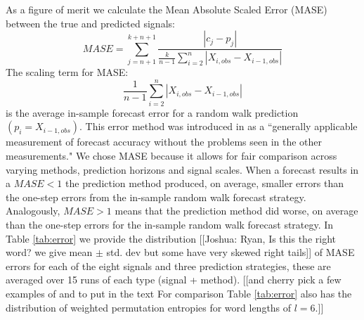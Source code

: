 As a figure of merit we calculate the Mean Absolute Scaled Error (MASE)\cite{MASE} between the true and predicted signals: 
$$MASE = \sum_{j=n+1}^{k+n+1}\frac{|c_j-p_j| }{\frac{k}{n-1}\sum^n_{i=2}|X_{i,obs}-X_{i-1,obs}|}$$
The scaling term for MASE:
$$\frac{1}{n-1}\sum^n_{i=2}|X_{i,obs}-X_{i-1,obs}|$$ 
is the average in-sample forecast error for a random walk prediction $(p_i=X_{i-1,obs})$. This error method was introduced in \cite{MASE} as a ``generally applicable measurement of forecast accuracy without the problems seen in the other measurements." We chose MASE because it allows for fair comparison across varying methods, prediction horizons and signal scales. When a forecast results in a $MASE<1$ the prediction method produced, on average, smaller errors than the one-step errors from the in-sample random walk forecast strategy. Analogously, $MASE>1$ means that the prediction method did worse, on average than the one-step errors for the in-sample random walk forecast strategy. In Table \ref{tab:error} we provide the distribution {\color{red}[[Joshua: Ryan, Is this the right word? we give mean $\pm$ std. dev but some have very skewed right tails]]}  of MASE errors for each of the eight signals and three prediction strategies, these are averaged over 15 runs of each type (signal + method). [[and cherry pick a few examples of \gcc and \col to put in the text For comparison Table \ref{tab:error} also has the distribution of weighted permutation entropies for word lengths of $l=6$.]]


